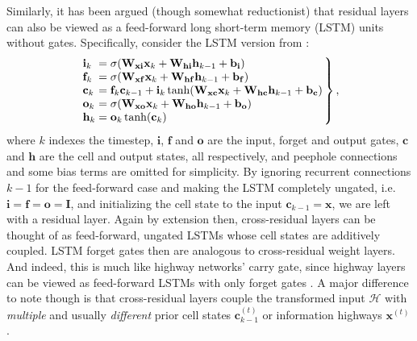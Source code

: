 \documentclass{sig-alternate-05-2015}
\newcommand{\mb}{\mathbf}
\begin{document}
Similarly, it has been argued (though somewhat reductionist) that residual layers can also be viewed as a feed-forward long short-term memory (LSTM) \cite{hochreiter_1997} units without gates.
Specifically, consider the LSTM version from \cite{gers_2002}:
%
\begin{equation}
 \left.\arraycolsep=1.4pt
 \begin{array}{ll}
  \mb i_k &= \sigma(\mb W_{\mb x\mb i}\mb x_k + \mb W_{\mb h\mb i}\mb h_{k-1} + \mb b_{\mb i}) \\
  \mb f_k &= \sigma(\mb W_{\mb x\mb f}\mb x_k + \mb W_{\mb h\mb f}\mb h_{k-1} + \mb b_{\mb f}) \\
  \mb c_k &= \mb f_k\mb c_{k-1} + \mb i_k\tanh(\mb W_{\mb x\mb c}\mb x_k + \mb W_{\mb h\mb c}\mb h_{k-1} + \mb b_{\mb c}) \\
  \mb o_k &= \sigma(\mb W_{\mb x\mb o}\mb x_k + \mb W_{\mb h\mb o}\mb h_{k-1} + \mb b_{\mb o}) \\
  \mb h_k &= \mb o_k\tanh(\mb c_k)
 \end{array}
 \right\},
 \label{eq:lstm}
\end{equation}
where $k$ indexes the timestep, $\mb i$, $\mb f$ and $\mb o$ are the input, forget and output gates, $\mb c$ and $\mb h$ are the cell and output states, all respectively, and peephole connections and some bias terms are omitted for simplicity.
By ignoring recurrent connections $k-1$ for the feed-forward case and making the LSTM completely ungated, i.e.~$\mb i = \mb f = \mb o = \mb I$, and initializing the cell state to the input $\mb c_{k-1} = \mb x$, we are left with a residual layer.
Again by extension then, cross-residual layers can be thought of as feed-forward, ungated LSTMs whose cell states are additively coupled.
LSTM forget gates then are analogous to cross-residual weight layers.
And indeed, this is much like highway networks' carry gate, since highway layers can be viewed as feed-forward LSTMs with only forget gates \cite{srivastava_2015}.
A major difference to note though is that cross-residual layers couple the transformed input $\mathcal{H}$ with \emph{multiple} and usually \emph{different} prior cell states $\mb c_{k-1}^{(t)}$ or information highways $\mb x^{(t)}$.
\end{document}

